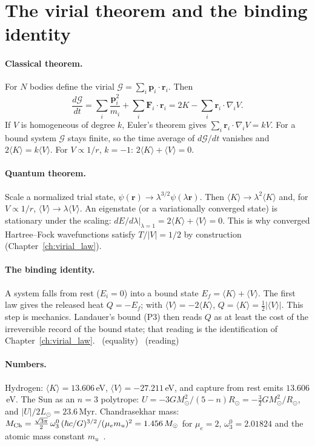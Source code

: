 \section{The virial theorem and the binding identity}\label{app:der:virial}
\paragraph{Classical theorem.} For $N$ bodies define the virial $\mathcal G=\sum_i\mathbf p_i\cdot\mathbf r_i$. Then
\begin{equation}
\frac{d\mathcal G}{dt}=\sum_i\frac{\mathbf p_i^2}{m_i}+\sum_i\mathbf F_i\cdot\mathbf r_i=2K-\sum_i\mathbf r_i\cdot\nabla_iV .
\end{equation}
If $V$ is homogeneous of degree $k$, Euler's theorem gives $\sum_i\mathbf r_i\cdot\nabla_iV=kV$. For a bound system $\mathcal G$ stays finite, so
the time average of $d\mathcal G/dt$ vanishes and $2\langle K\rangle=k\langle V\rangle$. For $V\propto1/r$, $k=-1$: $2\langle K\rangle+\langle V\rangle=0$. \derived

\paragraph{Quantum theorem.} Scale a normalized trial state, $\psi(\mathbf r)\to\lambda^{3/2}\psi(\lambda\mathbf r)$. Then $\langle K\rangle\to\lambda^2\langle K\rangle$
and, for $V\propto1/r$, $\langle V\rangle\to\lambda\langle V\rangle$. An eigenstate (or a variationally converged state) is stationary under the
scaling: $dE/d\lambda|_{\lambda=1}=2\langle K\rangle+\langle V\rangle=0$. This is why converged Hartree--Fock wavefunctions satisfy $T/|V|=1/2$ by
construction (Chapter~\ref{ch:virial_law}). \derived

\paragraph{The binding identity.} A system falls from rest ($E_i=0$) into a bound state $E_f=\langle K\rangle+\langle V\rangle$. The first law gives the
released heat $Q=-E_f$; with $\langle V\rangle=-2\langle K\rangle$, $Q=\langle K\rangle=\tfrac12|\langle V\rangle|$. This step is mechanics. Landauer's
bound (P3) then reads $Q$ as at least the cost of the irreversible record of the bound state; that reading is the identification of
Chapter~\ref{ch:virial_law}. \derived\ (equality) \interp\ (reading)

\paragraph{Numbers.} Hydrogen: $\langle K\rangle=13.606$\,eV, $\langle V\rangle=-27.211$\,eV, and capture from rest emits $13.606$\,eV. The Sun as an
$n=3$ polytrope: $U=-3GM_\odot^2/(5-n)R_\odot=-\tfrac32GM_\odot^2/R_\odot$, and $|U|/2L_\odot=23.6$\,Myr. Chandrasekhar mass:
$M_{\rm Ch}=\tfrac{\sqrt{3\pi}}{2}\,\omega_3^0\,(\hbar c/G)^{3/2}/(\mu_em_u)^2=1.456\,M_\odot$ for $\mu_e=2$, $\omega_3^0=2.01824$ and the atomic mass
constant $m_u$~\cite{Chandrasekhar1931}. \calc


